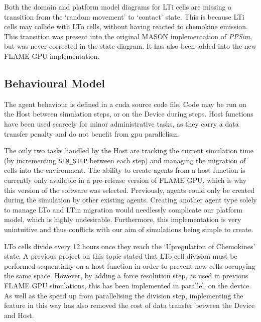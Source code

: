\documentclass{UoYCSproject}
\begin{document}
\label{missing_link}
Both the domain and platform model diagrams for \gls{LTi} cells are missing a transition from the `random movement' to `contact' state.
This is because \gls{LTi} cells may collide with \gls{LTo} cells, without having reacted to chemokine emission.
This transition was present into the original \gls{MASON} implementation of \textit{PPSim}, but was never corrected in the state diagram.
It has also been added into the new \gls{FLAME GPU} implementation.

\subsection{Behavioural Model}
The agent behaviour is defined in a \gls{cuda} source code file.
Code may be run on the \gls{Host} between simulation steps, or on the \gls{Device} during steps.
\gls{Host} functions have been used scarcely for minor administrative tasks, as they carry a data transfer penalty and do not benefit from \gls{gpu} parallelism.

The only two tasks handled by the \gls{Host} are tracking the current simulation time (by incrementing \texttt{SIM\_STEP} between each step) and managing the migration of cells into the environment.
The ability to create agents from a host function is currently only available in a pre-release version of \gls{FLAME GPU}, which is why this version of the software was selected.
Previously, agents could only be created during the simulation by other existing agents.
Creating another agent type solely to manage \gls{LTo} and \gls{LTin} migration would needlessly complicate our platform model, which is highly undesirable.
Furthermore, this implementation is very unintuitive and thus conflicts with our aim of simulations being simple to create.

\gls{LTo} cells divide every 12 hours once they reach the `Upregulation of Chemokines' state.
A previous project on this topic stated that \gls{LTo} cell division must be performed sequentially on a host function in order to prevent new cells occupying the same space\cite{phil_diss}.
However, by adding a force resolution step, as used in previous \gls{FLAME GPU} simulations\cite{flame_keratinocyte}, this has been implemented in parallel, on the device.
As well as the speed up from parallelising the division step, implementing the feature in this way has also removed the cost of data transfer between the \gls{Device} and \gls{Host}.
\end{document}
